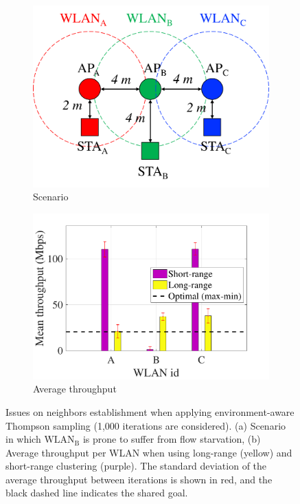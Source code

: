\documentclass{article}
\begin{document}
\begin{figure}[h!]
	\centering   		
	\begin{subfigure}[b]{0.35\textwidth}
		\includegraphics[width=\textwidth]{s3_new}
		\caption{Scenario}
		\label{fig:informed_s2}
	\end{subfigure}
	\begin{subfigure}[b]{0.4\textwidth}
		\includegraphics[width=\textwidth]{clustering_additive_interference}
		\caption{Average throughput}
		\label{fig:clustering_additive_interference}
	\end{subfigure}
	\caption{Issues on neighbors establishment when applying environment-aware Thompson sampling (1,000 iterations are considered). (a) Scenario in which $\text{WLAN}_\text{B}$ is prone to suffer from flow starvation, (b) Average throughput per WLAN when using long-range (yellow) and short-range clustering (purple). The standard deviation of the average throughput between iterations is shown in red, and the black dashed line indicates the shared goal.}
	\label{fig:clustering_issues}
\end{figure}   	
\end{document}
